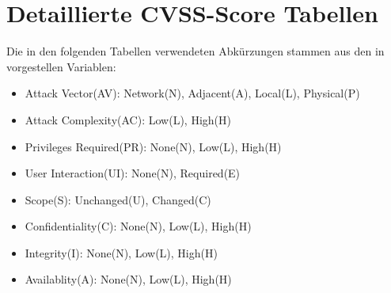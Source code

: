 \section{Detaillierte CVSS-Score Tabellen}
\label{apx:cvss}
    Die in den folgenden Tabellen verwendeten Abkürzungen stammen aus den in  vorgestellen Variablen:
    \begin{itemize}[noitemsep]
        \item Attack Vector(AV): Network(N), Adjacent(A), Local(L), Physical(P)
        \item Attack Complexity(AC): Low(L), High(H)
        \item Privileges Required(PR): None(N), Low(L), High(H)
        \item User Interaction(UI): None(N), Required(E)
        \item Scope(S): Unchanged(U), Changed(C)
        \item Confidentiality(C): None(N), Low(L), High(H)
        \item Integrity(I): None(N), Low(L), High(H)
        \item Availablity(A): None(N), Low(L), High(H)
    \end{itemize}
\newpage
